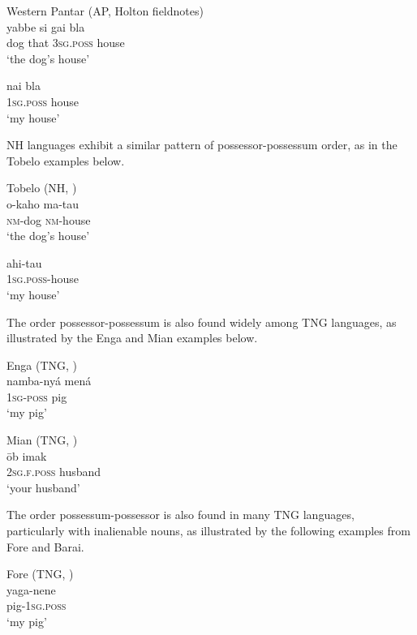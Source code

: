 \ea%
Western Pantar (AP, Holton fieldnotes)\\
\gll  yabbe si gai bla \\
   dog that \textsc{3sg.poss} house \\
\glt `the dog's house'
\z





\ea%
\gll  nai bla \\
  \textsc{1sg.poss} house \\
\glt `my house'
\z





NH languages exhibit a similar pattern of possessor-possessum order, as in the Tobelo examples below.

\ea%
Tobelo (NH, \citet{Holton2003})\\
\gll  o-kaho ma-tau \\
   \textsc{nm}-dog \textsc{nm}-house\\
\glt `the dog's house'
\z





\ea%
\gll  ahi-tau \\
 \textsc{1sg.poss}-house  \\
\glt `my house'
\z





The order possessor-possessum is also found widely among TNG languages, as illustrated by the Enga and Mian examples below.

\ea%
Enga (TNG, \citet[264]{Foley1986})\\
\gll  namba-ny\'a men\'a \\
 \textsc{1sg-poss} pig  \\
\glt `my pig'
\z





\ea%
Mian (TNG, \citet[217]{Fedden2011})\\
\gll  \=ob imak \\
   \textsc{2sg.f.poss} husband\\
\glt `your husband'
\z





The order possessum-possessor is also found in many TNG languages, particularly with inalienable nouns, as illustrated by the following examples from Fore and Barai.


\ea%
Fore (TNG, \citet[31]{Scott1978})\\
\gll  yaga-nene \\
   pig-\textsc{1sg.poss} \\
\glt `my pig'
\z





